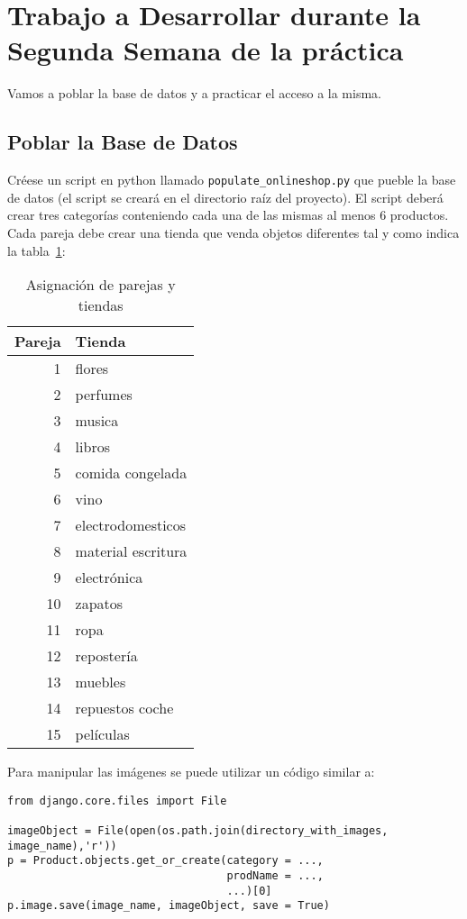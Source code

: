 \documentclass[12pt]{article} %
\newcommand{\proyecto}{\texttt{onlineshop}}%
\newcommand{\populatescript}{\texttt{populate\_\proyecto.py}}
\begin{document}



\section{Trabajo a Desarrollar durante la Segunda Semana de la práctica} %
Vamos a poblar la base de datos y a practicar el acceso a la misma. 

\subsection{Poblar la Base de Datos}
Créese un script en  python llamado \populatescript{} que pueble la base de datos (el script se creará en el directorio raíz del proyecto). El script deberá crear tres categorías conteniendo cada una de las mismas al menos 6 productos.
Cada pareja debe crear una tienda que venda objetos diferentes tal y como indica la  tabla~\ref{asignacion}:

\begin{table}[H]
\begin{tabular}{rl}
\hline
Pareja & Tienda \\ \hline
1  & flores    \\
2  & perfumes  \\
3  & musica    \\
4  & libros    \\
5  & comida congelada    \\
6  & vino    \\
7  & electrodomesticos  \\
8  & material escritura    \\
9  & electrónica\\
10  & zapatos\\
11  & ropa    \\
12  & repostería  \\
13  & muebles    \\
14  & repuestos coche    \\
15  & películas    \\ \hline
\end{tabular}
\centering
\caption{Asignación de parejas y tiendas}
\label{asignacion}
\end{table}

Para manipular las imágenes se puede utilizar un código similar a:

\begin{verbatim}
from django.core.files import File

imageObject = File(open(os.path.join(directory_with_images, image_name),'r'))
p = Product.objects.get_or_create(category = ...,
                                  prodName = ...,
                                  ...)[0]
p.image.save(image_name, imageObject, save = True)
\end{verbatim}
\end{document}
